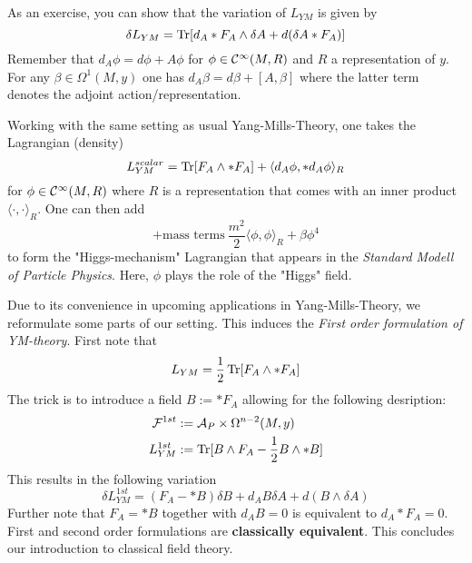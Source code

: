 \begin{ex}
  As an exercise, you can show that the variation of $L_{YM}$ is given by
  $$ \delta L_{YM} = \operatorname{Tr}[d_A * F_A \wedge \delta A + d(\delta A * F_A)] $$
  Remember that $d_A \phi = d\phi + A \phi$ for $\phi \in \Ci(M, R)$ and $R$ a representation of $y$. For any $\beta \in \Omega^1(M,y)$ one has $d_A \beta = d\beta + [A, \beta]$ where the latter term denotes the adjoint action/representation.
\end{ex}

\begin{definition}
  Working with the same setting as usual Yang-Mills-Theory, one takes the Lagrangian (density)
  $$ L^{scalar}_{YM} = \Tr[F_A \wedge * F_A] + \langle d_A \phi, *d_A \phi \rangle_R $$
  for $\phi \in \Ci(M, R)$ where $R$ is a representation that comes with an inner product $\langle \cdot , \cdot \rangle_R$. One can then add
  $$ + \text{mass terms} \ \frac{m^2}{2} \langle \phi, \phi \rangle_R + \beta \phi^4$$
  to form the "Higgs-mechanism" Lagrangian that appears in the \emph{Standard Modell of Particle Physics}. Here, $\phi$ plays the role of the "Higgs" field.
\end{definition}

Due to its convenience in upcoming applications in Yang-Mills-Theory, we reformulate some parts of our setting. This induces the \emph{First order formulation of YM-theory}. First note that
$$ L_{YM} = \frac{1}{2} \operatorname{Tr}[F_A \wedge * F_A] $$
The trick is to introduce a field $B := *F_A$ allowing for the following desription:
\begin{align}
  {\mathcal{F}}^{1st} &:= \mathcal{A}_P \times \Omega^{n-2}(M,y) \\
  L^{1st}_{YM} &:= \operatorname{Tr}[B \wedge F_A - \frac{1}{2} B \wedge *B]
\end{align}
This results in the following variation
$$ \delta L^{1st}_{YM} = (F_A - *B) \delta B + d_A B \delta A + d(B \wedge \delta A) $$
Further note that $F_A = *B$ together with $d_A B = 0$ is equivalent to $d_A * F_A = 0$. First and second order formulations are \textbf{classically equivalent}. This concludes our introduction to classical field theory.


\newpage

